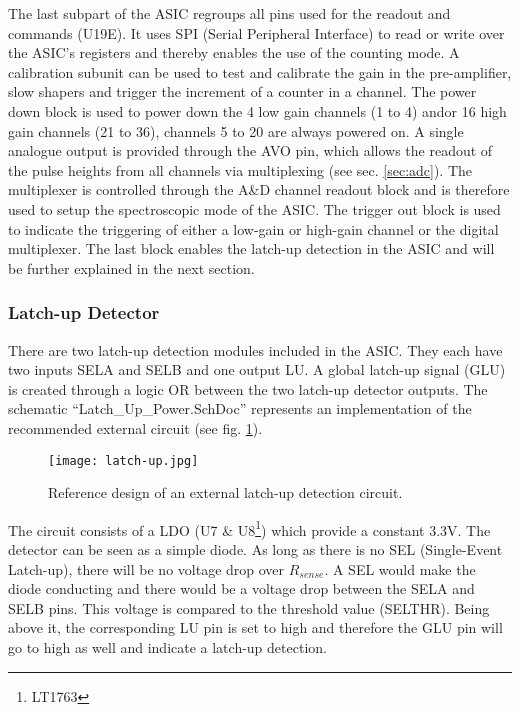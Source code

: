 The last subpart of the ASIC regroups all pins used for the readout and commands (U19E).
It uses SPI (Serial Peripheral Interface) to read or write over the ASIC's registers and thereby enables the use of the counting mode.
A calibration subunit can be used to test and calibrate the gain in the pre-amplifier, slow shapers and trigger the increment of a counter in a channel.
The power down block is used to power down the 4 low gain channels (1 to 4) and\/or 16 high gain channels (21 to 36), channels 5 to 20 are always powered on.
A single analogue output is provided through the AVO pin, which allows the readout of the pulse heights from all channels via multiplexing (see sec. \ref{sec:adc}).
The multiplexer is controlled through the A\&D channel readout block and is therefore used to setup the spectroscopic mode of the ASIC.
The trigger out block is used to indicate the triggering of either a low-gain or high-gain channel or the digital multiplexer.
The last block enables the latch-up detection in the ASIC and will be further explained in the next section.\cite{Meier2016VATA466}

\subsubsection{Latch-up Detector}
\label{sec:latchup_detector}
There are two latch-up detection modules included in the ASIC.
They each have two inputs SELA and SELB and one output LU.
A global latch-up signal (GLU) is created through a logic OR between the two latch-up detector outputs.
The schematic ``Latch\_Up\_Power.SchDoc'' represents an implementation of the recommended external circuit (see fig. \ref{fig:latch-up}).
\begin{figure}[H]
    \centering
    \texttt{[image: latch-up.jpg]}
    \caption[Latch-up Detection Module]{Reference design of an external latch-up detection circuit.\cite[p. 66, fig. 12]{Meier2016VATA466}}
    \label{fig:latch-up}
\end{figure}

The circuit consists of a LDO (U7 \& U8\footnote{LT1763}) which provide a constant 3.3V.
The detector can be seen as a simple diode.
As long as there is no SEL (Single-Event Latch-up), there will be no voltage drop over $R_{sense}$.
A SEL would make the diode conducting and there would be a voltage drop between the SELA and SELB pins.
This voltage is compared to the threshold value (SELTHR).
Being above it, the corresponding LU pin is set to high and therefore the GLU pin will go to high as well and indicate a latch-up detection.\cite[p. 66-68, fig. 12]{Meier2016VATA466}


